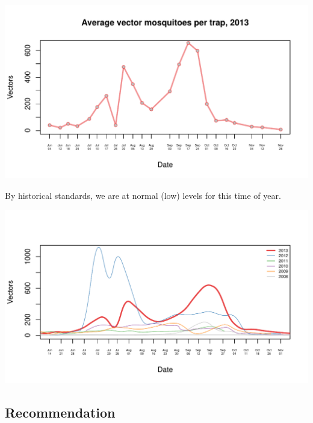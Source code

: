 \documentclass{article}
\begin{document}
\begin{center}
\includegraphics{mosq08nov13-003}
\end{center}
By historical standards, we are at normal (low) levels for this time of year.
\begin{center}
\includegraphics{mosq08nov13-004}
\end{center}
\subsection*{Recommendation}
\end{document}
